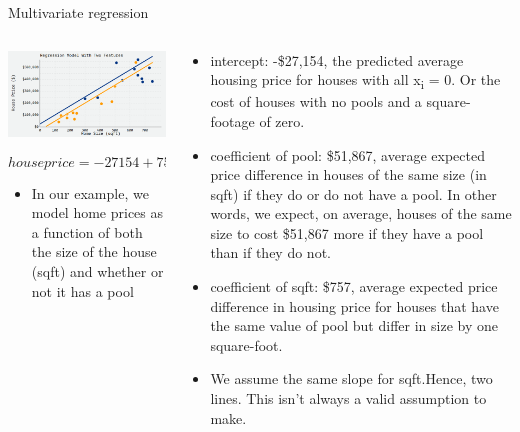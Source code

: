 \documentclass[australian,ignorenonframetext,aspectratio=169]{beamer}
\providecommand{\tightlist}{%
  \setlength{\itemsep}{0pt}\setlength{\parskip}{0pt}}
\begin{document}
\begin{frame}{Multivariate regression}
\protect\hypertarget{multivariate-regression}{}

\begin{columns}[T]
\begin{column}{0.5\textwidth}
\begin{center}\includegraphics[width=1\linewidth]{../graphs/interpret-3} \end{center}

\tiny

\[house price=-27154+757*sqft+51867*pool\]

\begin{itemize}
\tightlist
\item
  In our example, we model home prices as a function of both the size of
  the house (sqft) and whether or not it has a pool
\end{itemize}
\end{column}

\begin{column}{0.5\textwidth}
\tiny

\begin{itemize}
\item
  intercept: -\$27,154, the predicted average housing price for houses
  with all x\textsubscript{i} = 0. Or the cost of houses with no pools
  and a square-footage of zero.
\item
  coefficient of pool: \$51,867, average expected price difference in
  houses of the same size (in sqft) if they do or do not have a pool. In
  other words, we expect, on average, houses of the same size to cost
  \$51,867 more if they have a pool than if they do not.
\item
  coefficient of sqft: \$757, average expected price difference in
  housing price for houses that have the same value of pool but differ
  in size by one square-foot.
\item
  We assume the same slope for sqft.Hence, two lines. This isn't always
  a valid assumption to make.
\end{itemize}
\end{column}
\end{columns}

\end{frame}
\end{document}
